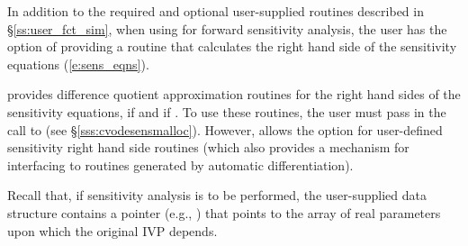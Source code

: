 In addition to the required and optional user-supplied routines described
in \S\ref{ss:user_fct_sim}, when using {\cvodes} for forward sensitivity analysis,
the user has the option of providing a routine that calculates the right hand side 
of the sensitivity equations (\ref{e:sens_eqns}).

{\cvodes} provides difference quotient approximation routines for the right
hand sides of the sensitivity equations,  if 
and  if . 
To use these routines, the user must pass  in the call to
 (see \S\ref{sss:cvodesensmalloc}). However, {\cvodes}
allows the option for user-defined sensitivity right hand side routines
(which also provides a mechanism for interfacing {\cvodes} to routines
generated by automatic differentiation).

Recall that, if sensitivity analysis is to be performed, the user-supplied 
data structure  contains a pointer (e.g., ) that points 
to the array of real parameters upon which the original IVP depends.

